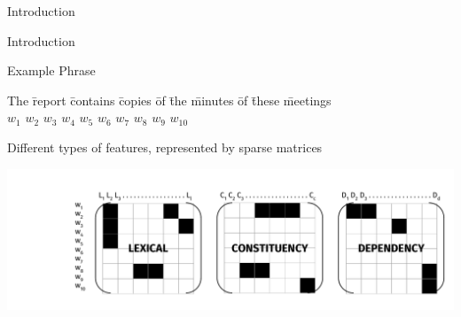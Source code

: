 \documentclass[10pt,xcolor=table]{beamer}
\begin{document}
\begin{frame}{Introduction}

\end{frame}

\begin{frame}{Introduction}
	\begin{block}{Example Phrase}
		\begin{tabbing}
			The \= report \= contains \= copies \= of \= the \= minutes \= of \= these \= meetings \\
			$w_1$ \> $w_2$ \> $w_3$ \> $w_4$  \> $w_5$ \> $w_6$ \> $w_7$ \> $w_8$ \> $w_9$ \> $w_{10}$
		\end{tabbing}
	\end{block}
Different types of features, represented by sparse matrices

	\begin{overprint}
	  \centering
	      \includegraphics[width=\linewidth]{image2/Chapitre1/feature_types.pdf}	
	\end{overprint}

\end{frame}
\end{document}
